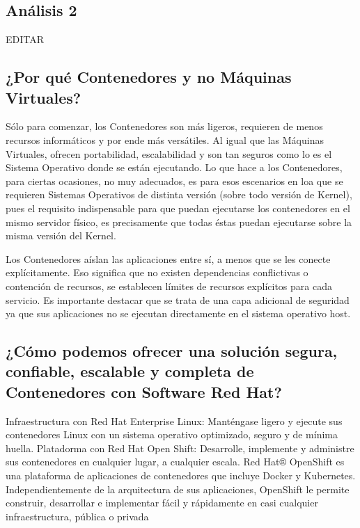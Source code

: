 \documentclass[preprint,12pt]{elsarticle}
\begin{document}
\subsection{\textbf{Análisis 2}}
EDITAR\\

\subsection{\textbf{¿Por qué Contenedores y no Máquinas Virtuales?}}
Sólo para comenzar, los Contenedores son más ligeros, requieren de menos recursos informáticos y por ende más versátiles. Al igual que las Máquinas Virtuales, ofrecen portabilidad, escalabilidad y son tan seguros como lo es el Sistema Operativo donde se están ejecutando. Lo que hace a los Contenedores, para ciertas ocasiones, no muy adecuados, es para esos escenarios en loa que se requieren Sistemas Operativos de distinta versión (sobre todo versión de Kernel), pues el requisito indispensable para que puedan ejecutarse los contenedores en el mismo servidor físico, es precisamente que todas éstas puedan ejecutarse sobre la misma versión del Kernel.

Los Contenedores aíslan las aplicaciones entre sí, a menos que se les conecte explícitamente. Eso significa que no existen dependencias conflictivas o contención de recursos, se establecen límites de recursos explícitos para cada servicio. Es importante destacar que se trata de una capa adicional de seguridad ya que sus aplicaciones no se ejecutan directamente en el sistema operativo host.

\subsection{\textbf{¿Cómo podemos ofrecer una solución segura, confiable, escalable y completa de Contenedores con Software Red Hat?}}
Infraestructura con Red Hat Enterprise Linux: Manténgase ligero y ejecute sus contenedores Linux con un sistema operativo optimizado, seguro y de mínima huella. Platadorma con Red Hat Open Shift: Desarrolle, implemente y administre sus contenedores en cualquier lugar, a cualquier escala. Red Hat® OpenShift es una plataforma de aplicaciones de contenedores que incluye Docker y Kubernetes. Independientemente de la arquitectura de sus aplicaciones, OpenShift le permite construir, desarrollar e implementar fácil y rápidamente en casi cualquier infraestructura, pública o privada

\end{document}
